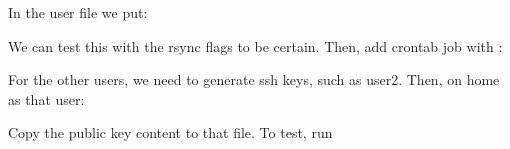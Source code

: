 \documentclass[a4paper,10pt,english]{sphinxmanual}
\begin{document}
In the user file  we put:

\begin{sphinxVerbatim}[commandchars=\\\{\}]
       
\end{sphinxVerbatim}

We can test this with the rsync  flags to be certain. Then, add crontab
job with :

\begin{sphinxVerbatim}[commandchars=\\\{\}]
      
\end{sphinxVerbatim}

For the other users, we need to generate ssh keys, such as user2. Then, on home as that user:

\begin{sphinxVerbatim}[commandchars=\\\{\}]
 
 
\end{sphinxVerbatim}

Copy the public key  content to that file. To test, run

\begin{sphinxVerbatim}[commandchars=\\\{\}]
   
\end{sphinxVerbatim}
\end{document}

